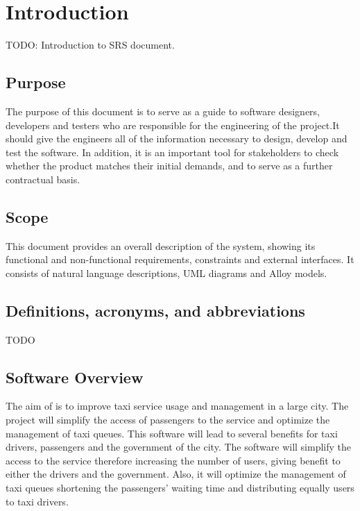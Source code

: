 \section{Introduction}      %
TODO: Introduction to \myTaxiService{} SRS document.
\subsection{Purpose}
The purpose of this document is to serve as a guide to software designers, developers and testers who are responsible for the engineering of the \myTaxiService{} project.\newline It should give the engineers all of the information necessary to design, develop and test the software.
In addition, it is an important tool for \myTaxiService{} stakeholders to check whether the product matches their initial demands, and to serve as a further contractual basis.
\subsection{Scope}
This document provides an overall description of the system, showing its functional and non-functional requirements, constraints and external interfaces.
It consists of natural language descriptions, UML diagrams and Alloy models.
\subsection{Definitions, acronyms, and abbreviations}
TODO
\subsection{Software Overview}
The aim of \myTaxiService{} is to improve taxi service usage and management in a large city.
The project will simplify the access of passengers to the service and optimize the management of taxi queues.
This software will lead to several benefits for taxi drivers, passengers and the government of the city.
The software will simplify the access to the service therefore increasing the number of users, giving benefit to either the drivers and the government.
Also, it will optimize the management of taxi queues shortening the passengers’ waiting time and distributing equally users to taxi drivers.
